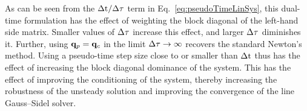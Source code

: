 As can be seen from the $\Delta \text{t}/\Delta \tau$ term in Eq.~\ref{eq:pseudoTimeLinSys}, this dual-time formulation has the effect of weighting the block diagonal of the left-hand side matrix. Smaller values of $\Delta \tau$ increase this effect, and larger $\Delta \tau$ diminishes it. Further, using $\mathbf{q}_{p} = \mathbf{q}_{c}$ in the limit $\Delta \tau \rightarrow \infty$ recovers the standard Newton's method. Using a pseudo-time step size close to or smaller than $\Delta \text{t}$ thus has the effect of increasing the block diagonal dominance of the system. This has the effect of improving the conditioning of the system, thereby increasing the robustness of the unsteady solution and improving the convergence of the line Gauss--Sidel solver.
